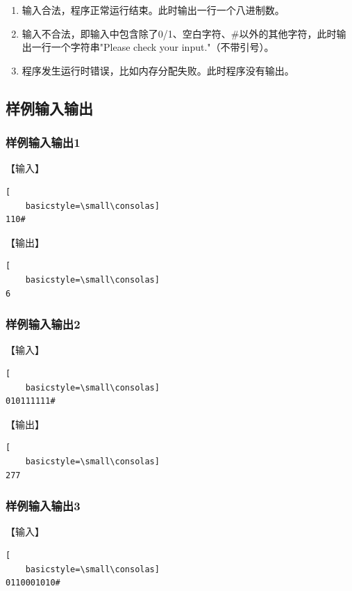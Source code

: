 \documentclass{article}
\begin{document}
\begin{enumerate}
    \item 输入合法，程序正常运行结束。此时输出一行一个八进制数。
    \item 输入不合法，即输入中包含除了0/1、空白字符、\#以外的其他字符，此时输出一行一个字符串"Please check your input."（不带引号）。
    \item 程序发生运行时错误，比如内存分配失败。此时程序没有输出。
\end{enumerate}

\subsection{样例输入输出}

\subsubsection{样例输入输出1}

【输入】

\begin{lstlisting}[
    basicstyle=\small\consolas]
110#
\end{lstlisting}

【输出】

\begin{lstlisting}[
    basicstyle=\small\consolas]
6
\end{lstlisting}

\subsubsection{样例输入输出2}

【输入】

\begin{lstlisting}[
    basicstyle=\small\consolas]
010111111#
\end{lstlisting}

【输出】

\begin{lstlisting}[
    basicstyle=\small\consolas]
277
\end{lstlisting}

\subsubsection{样例输入输出3}

【输入】

\begin{lstlisting}[
    basicstyle=\small\consolas]
0110001010#
\end{lstlisting}
\end{document}
